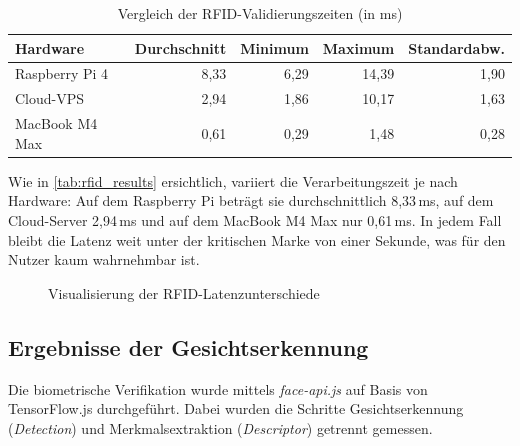 \begin{table}[H]
\centering
\caption{Vergleich der RFID-Validierungszeiten (in ms)}
\label{tab:rfid_results}
\begin{tabular}{lrrrr}
\toprule
Hardware & Durchschnitt & Minimum & Maximum & Standardabw. \\
\midrule
Raspberry Pi 4 & 8,33   & 6,29   & 14,39  & 1,90 \\
Cloud-VPS      & 2,94   & 1,86   & 10,17  & 1,63 \\
MacBook M4 Max & 0,61   & 0,29   & 1,48   & 0,28 \\
\bottomrule
\end{tabular}
\end{table}

Wie in \autoref{tab:rfid_results} ersichtlich, variiert die Verarbeitungszeit je nach Hardware: Auf dem Raspberry Pi beträgt sie durchschnittlich 8,33\,ms, auf dem Cloud-Server 2,94\,ms und auf dem MacBook M4 Max nur 0,61\,ms. In jedem Fall bleibt die Latenz weit unter der kritischen Marke von einer Sekunde, was für den Nutzer kaum wahrnehmbar ist.

\begin{figure}[htbp]
\centering
{}
\caption{Visualisierung der RFID-Latenzunterschiede}
\end{figure}

\subsection{Ergebnisse der Gesichtserkennung}
\label{subsec:ergebnisse_gesicht}

Die biometrische Verifikation wurde mittels \textit{face-api.js} auf Basis von TensorFlow.js durchgeführt. Dabei wurden die Schritte Gesichtserkennung (\textit{Detection}) und Merkmalsextraktion (\textit{Descriptor}) getrennt gemessen.


